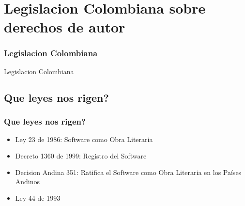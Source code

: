 \section{Legislacion Colombiana sobre derechos de autor}
\frame
{
	\frametitle{Legislacion Colombiana}
	\begin{center}
	Legislacion Colombiana
	\end{center}
}

\subsection{Que leyes nos rigen?}
\frame
{
	\frametitle{Que leyes nos rigen?}
	\begin{itemize}
	\item {Ley 23 de 1986: Software como Obra Literaria}
	\item {Decreto 1360 de 1999: Registro del Software}
	\item {Decision Andina 351: Ratifica el Software como Obra Literaria en los Países Andinos}
	\item {Ley 44 de 1993}
	\end{itemize}
}


